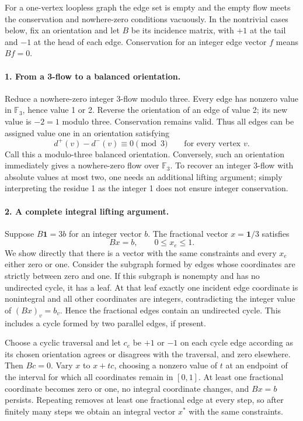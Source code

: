 \documentclass[11pt]{article}
\begin{document}
For a one-vertex loopless graph the edge set is empty and the empty flow meets the conservation and nowhere-zero conditions vacuously. In the nontrivial cases below, fix an orientation and let $B$ be its incidence matrix, with $+1$ at the tail and $-1$ at the head of each edge. Conservation for an integer edge vector $f$ means $Bf=0$.

\paragraph{1. From a 3-flow to a balanced orientation.}
Reduce a nowhere-zero integer 3-flow modulo three. Every edge has nonzero value in $\mathbb F_3$, hence value 1 or 2. Reverse the orientation of an edge of value 2; its new value is $-2=1$ modulo three. Conservation remains valid. Thus all edges can be assigned value one in an orientation satisfying
\[
 d^+(v)-d^-(v)\equiv0\pmod3
 \qquad\text{for every vertex }v.
\]
Call this a modulo-three balanced orientation. Conversely, such an orientation immediately gives a nowhere-zero flow over $\mathbb F_3$. To recover an integer 3-flow with absolute values at most two, one needs an additional lifting argument; simply interpreting the residue 1 as the integer 1 does not ensure integer conservation.

\paragraph{2. A complete integral lifting argument.}
Suppose $B\mathbf1=3b$ for an integer vector $b$. The fractional vector $x=\mathbf1/3$ satisfies
\[
 Bx=b,\qquad 0\le x_e\le1.
\]
We show directly that there is a vector with the same constraints and every $x_e$ either zero or one. Consider the subgraph formed by edges whose coordinates are strictly between zero and one. If this subgraph is nonempty and has no undirected cycle, it has a leaf. At that leaf exactly one incident edge coordinate is nonintegral and all other coordinates are integers, contradicting the integer value of $(Bx)_v=b_v$. Hence the fractional edges contain an undirected cycle. This includes a cycle formed by two parallel edges, if present.

Choose a cyclic traversal and let $c_e$ be $+1$ or $-1$ on each cycle edge according as its chosen orientation agrees or disagrees with the traversal, and zero elsewhere. Then $Bc=0$. Vary $x$ to $x+tc$, choosing a nonzero value of $t$ at an endpoint of the interval for which all coordinates remain in $[0,1]$. At least one fractional coordinate becomes zero or one, no integral coordinate changes, and $Bx=b$ persists. Repeating removes at least one fractional edge at every step, so after finitely many steps we obtain an integral vector $x^*$ with the same constraints.
\end{document}
